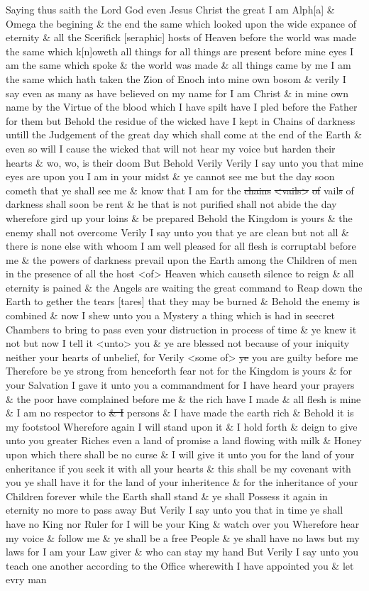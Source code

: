 				Saying thus saith the Lord God even Jesus Christ the great I am Alph[a] \& Omega the begining \& the end the same which looked upon the wide expance of eternity \& all the Scerifick [seraphic] hosts of Heaven before the world was made the same which k[n]oweth all things for all things are present before mine eyes I am the same which spoke \& the world was made \& all things came by me I am the same which hath taken the Zion of Enoch into mine own bosom \& verily I say even as many as have believed on my name for I am Christ \& in mine own name by the Virtue of the blood which I have spilt have I pled before the Father for them but Behold the residue of the wicked have I kept in Chains of darkness untill the Judgement of the great day which shall come at the end of the Earth \& even so will I cause the wicked that will not hear my voice but harden their hearts \& wo, wo, is their doom But Behold Verily Verily I say unto you that mine eyes are upon you I am in your midst \& ye cannot see me but the day soon cometh that ye shall see me \& know that I am for the \sout{chains} \sout{<vails>} \sout{of} vail\sout{s} of darkness shall soon be rent \& he that is not purified shall not abide the day wherefore gird up your loins \& be prepared Behold the Kingdom is yours \& the enemy shall not overcome Verily I say unto you that ye are clean but not all \& there is none else with whoom I am well pleased for all flesh is corruptabl before me \& the powers of darkness prevail upon the Earth among the Children of men in the presence of all the host <of> Heaven which causeth silence to reign \& all eternity is pained \& the Angels are waiting the great command to Reap down the Earth to gether the tears [tares] that they may be burned \& Behold the enemy is combined \& now I shew unto you a Mystery a thing which is had in seecret Chambers to bring to pass even your distruction in process of time \& ye knew it not but now I tell it <unto> you \& ye are blessed not because of your iniquity neither your hearts of unbelief, for Verily <some of> \sout{ye} you are guilty before me Therefore be ye strong from henceforth fear not for the Kingdom is yours \& for your Salvation I gave it unto you a commandment for I have heard your prayers \& the poor have complained before me \& the rich have I made \& all flesh is mine \& I am no respector to \sout{\& I} persons \& I have made the earth rich \& Behold it is my footstool Wherefore again I will stand upon it \& I hold forth \& deign to give unto you greater Riches even a land of promise a land flowing with milk \& Honey upon which there shall be no curse \& I will give it unto you for the land of your enheritance if you seek it with all your hearts \& this shall be my covenant with you ye shall have it for the land of your inheritence \& for the inheritance of your Children forever while the Earth shall stand \& ye shall Possess it again in eternity no more to pass away But Verily I say unto you that in time ye shall have no King nor Ruler for I will be your King \& watch over you Wherefore hear my voice \& follow me \& ye shall be a free People \& ye shall have no laws but my laws for I am your Law giver \& who can stay my hand But Verily I say unto you teach one another according to the Office wherewith I have appointed you \& let evry man 
